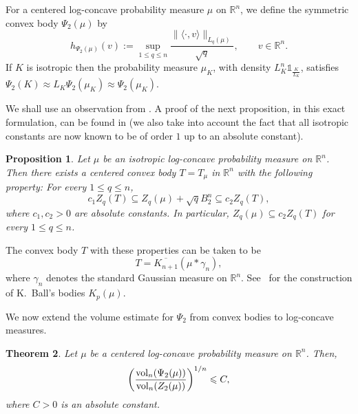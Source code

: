 \documentclass[11pt,leqno]{article}
\newtheorem{theorem}{Theorem}[section]
\newtheorem{proposition}[theorem]{Proposition}
\theoremstyle{definition}
\numberwithin{equation}{section}
\newcommand{\ls}{\leqslant}
\begin{document}
For a centered log-concave probability measure $\mu$ on $\mathbb{R}^n$, we define the symmetric convex body $\Psi_{2}(\mu)$
by 
\begin{equation*} h_{\Psi_{2}(\mu)}(v ):= \sup_{1\ls q\ls n}\frac{\|\langle \cdot, v \rangle \|_{L_q(\mu)}}{\sqrt{q}}, \qquad v\in\mathbb{R}^n.\end{equation*} 
If $K$ is isotropic then the probability measure $\mu_K$, with density $L_K^n\mathds{1}_{\frac{K}{L_K}}$, satisfies $\Psi_2(K)\approx L_K\Psi_2(\mu_K)\approx \Psi_2(\mu_K)$.

We shall use an observation from \cite{GPV11}. A proof of the next proposition, in this exact formulation, can be found in \cite[Proposition~8.1.7]{BGVV-book}
(we also take into account the fact that all isotropic constants are now known to be of order $1$ up to an absolute constant).

\begin{proposition}\label{prop:Zq-control}
Let $\mu$ be an isotropic log-concave probability measure on $\mathbb{R}^n$. Then there exists a centered convex body $T=T_\mu$ in $\mathbb{R}^n$ with
the following property: For every $1\ls q\ls n$,
\begin{equation*}c_1Z_q(T)\subseteq Z_q(\mu)+\sqrt{q}B_2^n\subseteq c_2 Z_q(T),\end{equation*} 
where $c_1,c_2>0$ are absolute constants. In particular, $Z_q(\mu)\subseteq c_2Z_q(T)$ for every $1\ls q\ls n$.
\end{proposition} 

The convex body $T$ with these properties can be taken to be
\[T=\overline{K_{n+1}}(\mu\ast\gamma_n),\]
where $\gamma_n$ denotes the standard Gaussian measure on $\mathbb{R}^n$.
See~\cite[Chapter~2]{BGVV-book} for the construction of
K.~Ball's bodies $K_p(\mu)$.

\medskip

We now extend the volume estimate for $\Psi_2$ from convex bodies to
log-concave measures.

\begin{theorem}\label{th:vol-ratio-psi2-body-measure}
Let $\mu$ be a centered log-concave probability measure on $\mathbb{R}^n$. Then,
\begin{equation*}\left(\frac{{\rm vol}_n(\Psi_{2}(\mu))}{{\rm vol}_n(Z_{2}(\mu))}\right)^{1/n} \ls C,\end{equation*} 
where $C>0$ is an absolute constant. 
\end{theorem}
\end{document}
